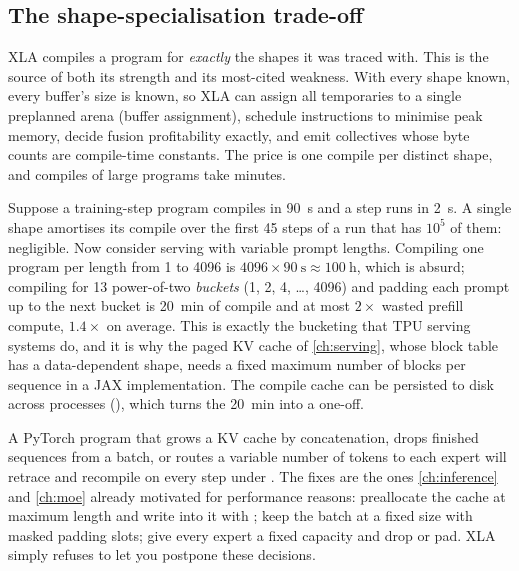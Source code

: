 \subsection{The shape-specialisation trade-off}
XLA compiles a program for \emph{exactly} the shapes it was traced with. This is the source
of both its strength and its most-cited weakness. With every shape known, every buffer's
size is known, so XLA can assign all temporaries to a single preplanned arena (buffer
assignment), schedule instructions to minimise peak memory, decide fusion profitability
exactly, and emit collectives whose byte counts are compile-time constants. The price is one
compile per distinct shape, and compiles of large programs take minutes.

\begin{napkinmath}
Suppose a training-step program compiles in \SI{90}{\second} and a step runs in
\SI{2}{\second}. A single shape amortises its compile over the first 45 steps of a run that
has $10^5$ of them: negligible. Now consider serving with variable prompt lengths. Compiling
one program per length from 1 to 4096 is $4096\times\SI{90}{\second}\approx\SI{100}{\hour}$,
which is absurd; compiling for 13 power-of-two \emph{buckets} (1, 2, 4, \dots, 4096) and
padding each prompt up to the next bucket is \SI{20}{\minute} of compile and at most
$2\times$ wasted prefill compute, $1.4\times$ on average. This is exactly the bucketing that
TPU serving systems do, and it is why the paged KV cache of \cref{ch:serving}, whose block
table has a data-dependent shape, needs a fixed maximum number of blocks per sequence in a
JAX implementation. The compile cache can be persisted to disk across processes
(), which turns the \SI{20}{\minute}
into a one-off.
\end{napkinmath}

\begin{pitfall}
A PyTorch program that grows a KV cache by concatenation, drops finished sequences from a
batch, or routes a variable number of tokens to each expert will retrace and recompile on
every step under . The fixes are the ones \cref{ch:inference} and
\cref{ch:moe} already motivated for performance reasons: preallocate the cache at maximum
length and write into it with ; keep the batch at a fixed size
with masked padding slots; give every expert a fixed capacity and drop or pad. XLA simply
refuses to let you postpone these decisions.
\end{pitfall}

